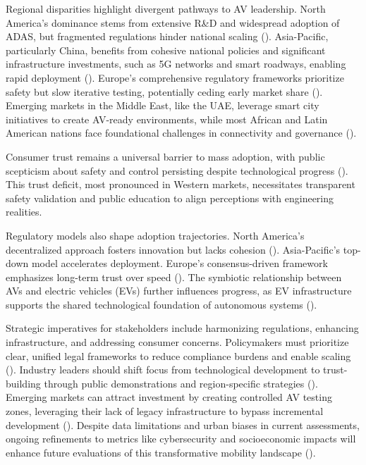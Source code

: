 Regional disparities highlight divergent pathways to AV leadership. North America's dominance stems from extensive R\&D and widespread adoption of ADAS, but fragmented regulations hinder national scaling (\cite{NCSL2025}). Asia-Pacific, particularly China, benefits from cohesive national policies and significant infrastructure investments, such as 5G networks and smart roadways, enabling rapid deployment (\cite{KPMG2018}). Europe's comprehensive regulatory frameworks prioritize safety but slow iterative testing, potentially ceding early market share (\cite{GOVUK2024}). Emerging markets in the Middle East, like the UAE, leverage smart city initiatives to create AV-ready environments, while most African and Latin American nations face foundational challenges in connectivity and governance (\cite{DubaiLaw2023}).

Consumer trust remains a universal barrier to mass adoption, with public scepticism about safety and control persisting despite technological progress (\cite{PatentPC2025a,Deloitte2024}). This trust deficit, most pronounced in Western markets, necessitates transparent safety validation and public education to align perceptions with engineering realities.

Regulatory models also shape adoption trajectories. North America's decentralized approach fosters innovation but lacks cohesion (\cite{NCSL2025}). Asia-Pacific's top-down model accelerates deployment. Europe's consensus-driven framework emphasizes long-term trust over speed (\cite{GOVUK2024}). The symbiotic relationship between AVs and electric vehicles (EVs) further influences progress, as EV infrastructure supports the shared technological foundation of autonomous systems (\cite{IEA2024}).

Strategic imperatives for stakeholders include harmonizing regulations, enhancing infrastructure, and addressing consumer concerns. Policymakers must prioritize clear, unified legal frameworks to reduce compliance burdens and enable scaling (\cite{NCSL2025}). Industry leaders should shift focus from technological development to trust-building through public demonstrations and region-specific strategies (\cite{Deloitte2024}). Emerging markets can attract investment by creating controlled AV testing zones, leveraging their lack of legacy infrastructure to bypass incremental development (\cite{DubaiLaw2023}). Despite data limitations and urban biases in current assessments, ongoing refinements to metrics like cybersecurity and socioeconomic impacts will enhance future evaluations of this transformative mobility landscape (\cite{KPMG2018}).

